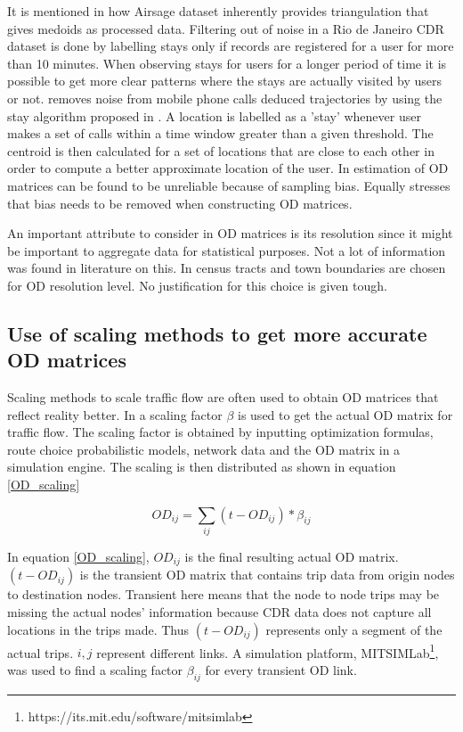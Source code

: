 \documentclass[12pt, a4paper]{report}
\theoremstyle{definition}
\theoremstyle{definition}%
\theoremstyle{definition}%
\theoremstyle{definition}%
\theoremstyle{definition}%
\theoremstyle{definition}%
\begin{document}
It is mentioned in \cite{Colak2015} how Airsage dataset inherently provides triangulation that gives medoids as processed data. Filtering out of noise in a Rio de Janeiro CDR dataset is done by labelling stays only if records are registered for a user for more than 10 minutes. When observing stays for users for a longer period of time it is possible to get more clear patterns where the stays are actually visited by users or not. \cite{Toole2015} removes noise from mobile phone calls deduced trajectories by using the stay algorithm proposed in \cite{Zheng2011}. A location is labelled as a 'stay' whenever user makes a set of calls within a time window greater than a given threshold. The centroid is then calculated for a set of locations that are close to each other in order to compute a better approximate location of the user. In \cite{Iqbal2014}  estimation of OD matrices can be found to be unreliable because of sampling bias. Equally \cite{Toole2015} stresses that bias needs to be removed when constructing OD matrices.

An important attribute to consider in OD matrices is its resolution since it might be important to aggregate data for statistical purposes. Not a lot of information was found in literature on this. In \cite{Colak2015} census tracts and town boundaries are chosen for OD resolution level. No justification for this choice is given tough.

\subsection{Use of scaling methods to get more accurate OD matrices} \label{subsection:OD_scaling}

Scaling methods to scale traffic flow are often used to obtain OD matrices that reflect reality better. In \cite{Iqbal2014} a scaling factor $\beta$ is used to get the actual OD matrix for traffic flow. The scaling factor is obtained by inputting optimization formulas, route choice probabilistic models, network data and the OD matrix in a simulation engine. The scaling is then distributed as shown in equation \ref{OD_scaling}

\begin{equation}\label{OD_scaling}
\textit{OD}_{ij} = \sum _{ij} (t-OD_{ij}) * \beta_{ij} 
\end{equation}

In equation \ref{OD_scaling}, $OD_{ij}$ is the final resulting actual OD matrix.  $(t-OD_{ij})$ is the transient OD matrix that contains trip data from origin nodes to destination nodes. Transient here means that the node to node trips may be missing the actual nodes' information because CDR data does not capture all locations in the trips made. Thus $(t-OD_{ij})$ represents only a segment of the actual trips. $i,j$ represent different links. A simulation platform, MITSIMLab\footnote{https://its.mit.edu/software/mitsimlab}, was used to find a scaling factor $\beta_{ij}$ for every transient OD link.
\end{document}
